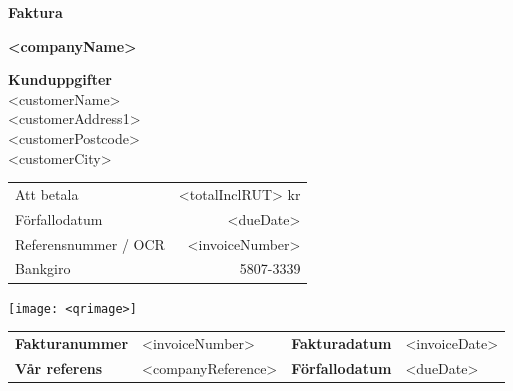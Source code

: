 \documentclass[a4paper,11pt]{extarticle}
\begin{document}
\pagestyle{fancy}
\fancyhf{} %
\renewcommand{\headrulewidth}{0pt}
\renewcommand{\footrulewidth}{0pt}

\setlength{\fboxsep}{1.5em}
\setlength{\parindent}{0pt}

\begin{minipage}[b]{0.4\textwidth}
\raggedright
{\color{Primary}
\fontsize{36}{0}\selectfont
\textbf{Faktura}}
\end{minipage}%
\begin{minipage}[b]{0.6\textwidth}
\raggedleft
{\color{Secondary}
\fontsize{36}{0}\selectfont
\textbf{<companyName>}}
\end{minipage}

\vspace{2em}
\parbox{0.3\textwidth}{
\begin{tcolorbox}[height=3cm,valign=center]
    \textbf{Kunduppgifter} \\
    <customerName>\\
    <customerAddress1>\\
    <customerPostcode>\\
    <customerCity>\\
\end{tcolorbox}
}%
\hfill
\parbox{0.67\textwidth}{%
\begin{tcolorbox}[height=3cm,valign=center]
\parbox{0.45\textwidth}{%
\large\color{Primary}
\begin{tabularx}{\textwidth}{@{}lr}
    Att betala & <totalInclRUT> kr \\
    Förfallodatum & <dueDate> \\
    Referensnummer / OCR & <invoiceNumber> \\
    Bankgiro & 5807-3339 \\
\end{tabularx}
}\hfill\parbox{2.5cm}{\texttt{[image: <qrimage>]}}
\end{tcolorbox}
}

\vspace{1em}

\renewcommand\arraystretch{1.5}
{\small
\begin{tabularx}{\linewidth}{XlXl}
    \textbf{Fakturanummer} & <invoiceNumber> & \textbf{Fakturadatum} & <invoiceDate> \\
    \textbf{Vår referens} & <companyReference> & \textbf{Förfallodatum} & <dueDate> \\
\end{tabularx}
}
\end{document}

